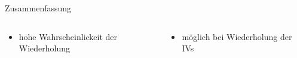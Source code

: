 {\begin{frame}{Zusammenfassung}
    \begin{columns}
        \begin{column}{0.33\textwidth}
           \begin{itemize}
                \item hohe Wahrscheinlickeit der Wiederholung
           \end{itemize} 
        \end{column}

        \begin{column}{0.33\textwidth}
           \begin{itemize}
                \item möglich bei Wiederholung der IVs
           \end{itemize} 
        \end{column}

        \begin{column}{0.33\textwidth}
        \end{column}

    \end{columns}
    \vspace{0.3cm}

\end{frame}
}